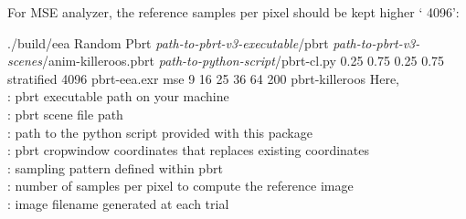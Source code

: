 For MSE analyzer, the reference samples per pixel should be kept higher ` 4096':
%
\begin{tcolorbox}
./build/eea   Random 
  Pbrt 
 \emph{path-to-pbrt-v3-executable}/pbrt 
 \emph{path-to-pbrt-v3-scenes}/anim-killeroos.pbrt 
 \emph{path-to-python-script}/pbrt-cl.py 
 0.25 0.75 0.25 0.75 
 stratified
 4096
 pbrt-eea.exr 
  mse  9 16 25 36 64  200 
  pbrt-killeroos
\tcblower
Here, \\
: pbrt executable path on your machine \\
: pbrt scene file path \\
: path to the python script provided with this package \\
: pbrt cropwindow coordinates that replaces existing coordinates \\
: sampling pattern defined within pbrt \\
: number of samples per pixel to compute the reference image \\
: image filename generated at each trial 
\end{tcolorbox}
%
%
